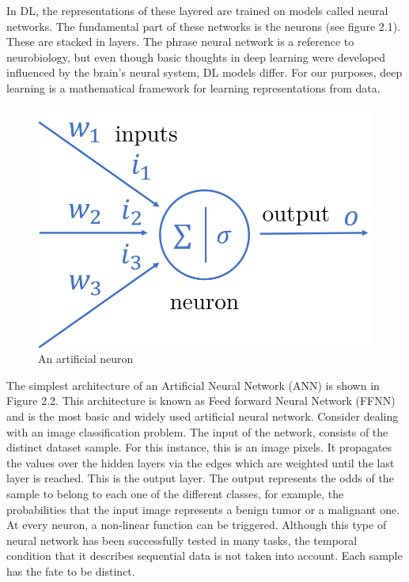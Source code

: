 In DL, the representations of these layered are trained on models called neural networks.
The fundamental part of these networks is the neurons (see figure 2.1).
These are stacked in layers.
The phrase neural network is a reference to neurobiology, but even though basic thoughts in deep learning were
developed influenced by the brain's neural system, DL models differ.
For our purposes, deep learning is a mathematical framework for learning representations from data.

\begin{figure}[H]
    \centering
    \includegraphics[scale=.40]{./images/background/neuron.png}
    \caption{An artificial neuron}
    \label{fig:neuron_fig}
\end{figure}

The simplest architecture of an Artificial Neural Network (ANN) is shown in Figure 2.2.
This architecture is known as Feed forward Neural Network (FFNN) and is the most basic and widely used artificial neural network.
Consider dealing with an image classification problem.
The input of the network, consists of the distinct dataset sample.
For this instance, this is an image pixels.
It propagates the values over the hidden layers via the edges which are weighted until the last layer is reached.
This is the output layer.
The output represents the odds of the sample to belong to each one of the different classes, for example,
the probabilities that the input image represents a benign tumor or a malignant one.
At every neuron, a non-linear function can be triggered.
Although this type of neural network has been successfully tested in many tasks, the
temporal condition that it describes sequential data is not taken into account.
Each sample has the fate to be distinct.

